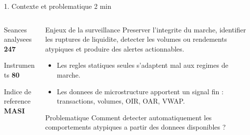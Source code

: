 \documentclass[aspectratio=169,10pt]{beamer}
\newcommand{\duration}[1]{\hfill{\scriptsize\color{bvcgold}#1}}
\newcommand{\metric}[3]{%
  \begin{block}{#1}
    {\Large\bfseries #2}\par\vspace{0.15em}{\scriptsize #3}
  \end{block}
}
\begin{document}
\begin{frame}{1. Contexte et problematique \duration{2 min}}
  \begin{columns}[T,onlytextwidth]
    \begin{column}{0.34\textwidth}
      \metric{Seances analysees}{247}{Annee 2025}
      \metric{Instruments}{80}{Titres presents dans le dataset}
      \metric{Indice de reference}{MASI}{Lecture macro du marche}
    \end{column}
    \begin{column}{0.62\textwidth}
      \begin{block}{Enjeux de la surveillance}
        Preserver l'integrite du marche, identifier les ruptures de liquidite, detecter les volumes ou rendements atypiques et produire des alertes actionnables.
      \end{block}
      \begin{itemize}
        \item Les regles statiques seules s'adaptent mal aux regimes de marche.
        \item Les donnees de microstructure apportent un signal fin : transactions, volumes, OIR, OAR, VWAP.
      \end{itemize}
      \begin{block}{Problematique}
        Comment detecter automatiquement les comportements atypiques a partir des donnees disponibles ?
      \end{block}
    \end{column}
  \end{columns}
\end{frame}
\end{document}
